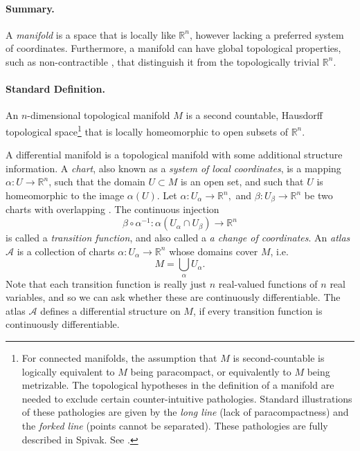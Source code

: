 \documentclass[12pt]{article}
\newcommand{\reals}{\mathbb{R}}
\newcommand{\cA}{\mathcal{A}}
\begin{document}
\paragraph{Summary.} A {\em manifold} is a space that is
locally like $\reals^n$, however lacking a preferred system of
coordinates.  Furthermore, a manifold can have global topological
properties, such as non-contractible , that distinguish it from
the topologically trivial $\reals^n$.

\paragraph{Standard Definition.} 
An $n$-dimensional topological manifold $M$ is a second countable, Hausdorff
topological space\footnote{For connected manifolds, the  assumption that $M$ is
second-countable  is logically equivalent to $M$ being paracompact, or
equivalently to $M$ being metrizable. The topological hypotheses in the definition of a manifold are needed
to exclude certain counter-intuitive pathologies.  Standard
illustrations of these pathologies are given by the {\em long line}
(lack of paracompactness) and the {\em forked line} (points cannot be
separated). These pathologies are fully described in Spivak. 
See .} 
that is locally homeomorphic to open subsets of
$\reals^n$.

A differential manifold is a topological manifold with some additional
structure information.  A \emph{chart}, also known as a \emph{system
  of local coordinates}, is a mapping $\alpha: U \to \reals^n$, such that the domain $U\subset M$ is an open set, and such that $U$ is homeomorphic to the image $\alpha(U)$.  Let
$\alpha: U_\alpha \rightarrow \reals^n,$ and
$\beta:U_\beta\rightarrow\reals^n$ be two charts with overlapping
. The continuous injection
$$\beta\circ\alpha^{-1}: \alpha(U_\alpha\cap
U_\beta)\rightarrow\reals^n$$
is called a \emph{transition function},
and also called a \emph{a change of coordinates}.  An {\em atlas}
$\cA$ is a collection of charts $\alpha:U_\alpha\rightarrow\reals^n$
whose domains cover $M$, i.e.
$$M = \bigcup_{\alpha} U_\alpha.$$
Note that each transition function
is really just $n$ real-valued functions of $n$ real variables, and so
we can ask whether these are continuously differentiable. The atlas
$\cA$ defines a differential structure on $M$, if every transition function 
is continuously differentiable.
\end{document}
